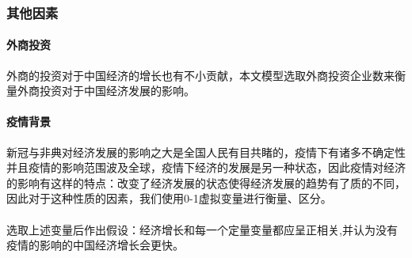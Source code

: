 \documentclass[UTF8]{article}
\begin{document}
	\subsubsection{其他因素}
	\paragraph{外商投资}外商的投资对于中国经济的增长也有不小贡献，本文模型选取外商投资企业数来衡量外商投资对于中国经济发展的影响。
	\vspace{-10pt}
	\paragraph{疫情背景}新冠与非典对经济发展的影响之大是全国人民有目共睹的，疫情下有诸多不确定性并且疫情的影响范围波及全球，疫情下经济的发展是另一种状态，因此疫情对经济的影响有这样的特点：改变了经济发展的状态使得经济发展的趋势有了质的不同，因此对于这种性质的因素，我们使用0-1虚拟变量进行衡量、区分。
	\\
	\\\indent
	选取上述变量后作出假设：经济增长和每一个定量变量都应呈正相关,并认为没有疫情的影响的中国经济增长会更快。
\end{document}
